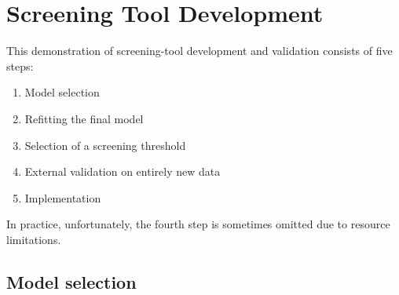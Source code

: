 \documentclass[11pt]{report}\usepackage[]{graphicx}\usepackage[]{xcolor}
\begin{document}
\section*{Screening Tool Development}

This demonstration of screening-tool development and
validation consists of five steps:
\begin{enumerate}
\item Model selection
\item Refitting the final model
\item Selection of a screening threshold
\item External validation on entirely new data
\item Implementation
\end{enumerate}

In practice, unfortunately, the fourth step is sometimes omitted due to
resource limitations.

\subsection*{Model selection}
\end{document}
